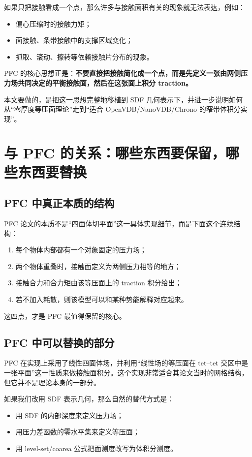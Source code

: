 \documentclass[12pt,a4paper]{ctexart}
\begin{document}
如果只把接触看成一个点，那么许多与接触面积有关的现象就无法表达，例如：
\begin{itemize}
    \item 偏心压缩时的接触力矩；
    \item 面接触、条带接触中的支撑区域变化；
    \item 抓取、滚动、擦转等依赖接触片分布的现象。
\end{itemize}

PFC 的核心思想正是：\textbf{不要直接把接触简化成一个点，而是先定义一张由两侧压力场共同决定的平衡接触面，然后在这张面上积分 traction。}

本文要做的，是把这一思想完整地移植到 SDF 几何表示下，并进一步说明如何从“零厚度等压面理论”走到“适合 OpenVDB/NanoVDB/Chrono 的窄带体积分实现”。

\section{与 PFC 的关系：哪些东西要保留，哪些东西要替换}

\subsection{PFC 中真正本质的结构}
PFC 论文的本质不是“四面体切平面”这一具体实现细节，而是下面这个连续结构：
\begin{enumerate}
    \item 每个物体内部都有一个对象固定的压力场；
    \item 两个物体重叠时，接触面定义为两侧压力相等的地方；
    \item 接触合力和合力矩由该等压面上的 traction 积分给出；
    \item 若不加入耗散，则该模型可以和某种势能解释对应起来。
\end{enumerate}

这四点，才是 PFC 最值得保留的核心。

\subsection{PFC 中可以替换的部分}
PFC 在实现上采用了线性四面体场，并利用“线性场的等压面在 tet--tet 交区中是一张平面”这一性质来做接触面积分。这个实现非常适合其论文当时的网格结构，但它并不是理论本身的一部分。

如果我们改用 SDF 表示几何，那么自然的替代方式是：
\begin{itemize}
    \item 用 SDF 的内部深度来定义压力场；
    \item 用压力差函数的零水平集来定义等压面；
    \item 用 level-set/coarea 公式把面测度改写为体积分测度。
\end{itemize}
\end{document}
